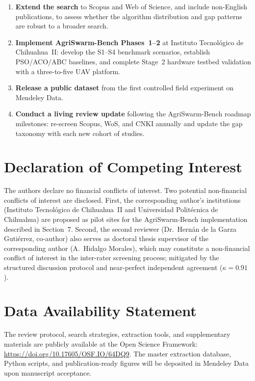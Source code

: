 \documentclass[review,3p]{elsarticle}
\begin{document}
\begin{enumerate}
  \item \textbf{Extend the search} to Scopus and Web of Science, and include
  non-English publications, to assess whether the algorithm distribution and
  gap patterns are robust to a broader search.
  \item \textbf{Implement AgriSwarm-Bench Phases~1--2} at Instituto Tecnológico
  de Chihuahua~II: develop the S1--S4 benchmark scenarios, establish
  PSO/ACO/ABC baselines, and complete Stage~2 hardware testbed validation with
  a three-to-five UAV platform.
  \item \textbf{Release a public dataset} from the first controlled field
  experiment on Mendeley Data.
  \item \textbf{Conduct a living review update} following the AgriSwarm-Bench
  roadmap milestones: re-screen Scopus, WoS, and CNKI annually and update the
  gap taxonomy with each new cohort of studies.
\end{enumerate}


\section*{Declaration of Competing Interest}
The authors declare no financial conflicts of interest. Two potential
non-financial conflicts of interest are disclosed. First, the corresponding
author's institutions (Instituto Tecnológico de Chihuahua~II and Universidad
Politécnica de Chihuahua) are proposed as pilot sites for the AgriSwarm-Bench
implementation described in Section~7. Second, the second reviewer
(Dr.~Hernán de la Garza Gutiérrez, co-author) also serves as doctoral thesis
supervisor of the corresponding author (A.~Hidalgo Morales), which may
constitute a non-financial conflict of interest in the inter-rater screening
process; mitigated by the structured discussion protocol and near-perfect
independent agreement ($\kappa = 0.91$).

\section*{Data Availability Statement}
The review protocol, search strategies, extraction tools, and supplementary
materials are publicly available at the Open Science Framework:
\url{https://doi.org/10.17605/OSF.IO/64DQ9}.
The master extraction database, Python scripts, and publication-ready figures
will be deposited in Mendeley Data upon manuscript acceptance.
\end{document}
